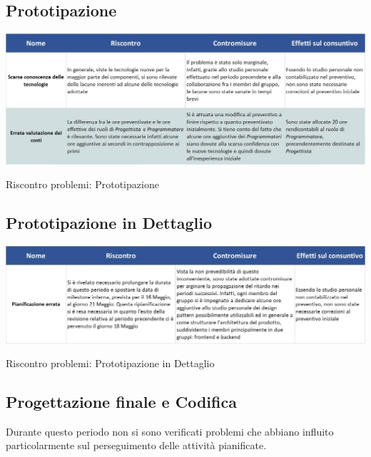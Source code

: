 \subsection{Prototipazione}
\begin{table}[h!]
	\centerline{\includegraphics[scale=0.55]{img/Rischi/RiscontroProblemi-Prototipazione.jpg}}
	\caption{Riscontro problemi: Prototipazione}
\end{table}
\clearpage

\subsection{Prototipazione in Dettaglio} \label{RiscontroPrototipazioneDettaglio}
\begin{table}[h!]
	\centerline{\includegraphics[scale=0.55]{img/Rischi/RiscontroProblemi-PrototipazioneDettaglio.jpg}}
	\caption{Riscontro problemi: Prototipazione in Dettaglio}
\end{table}

\subsection{Progettazione finale e Codifica}
Durante questo periodo non si sono verificati problemi che abbiano influito particolarmente sul perseguimento delle attività pianificate.
